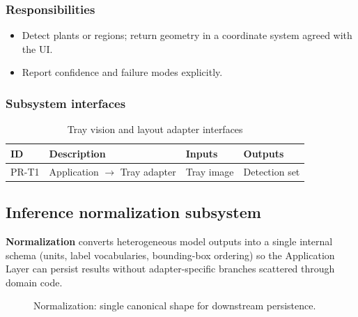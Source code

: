 \subsubsection{Responsibilities}
\begin{itemize}
  \item Detect plants or regions; return geometry in a coordinate system agreed with the UI.
  \item Report confidence and failure modes explicitly.
\end{itemize}

\subsubsection{Subsystem interfaces}
\begin{table}[H]
\centering
\small
\begin{tabular}{|p{0.9cm}|p{3.4cm}|p{3.0cm}|p{3.5cm}|}
\hline
\textbf{ID} & \textbf{Description} & \textbf{Inputs} & \textbf{Outputs} \\
\hline
PR-T1 & Application $\rightarrow$ Tray adapter & Tray image & Detection set \\
\hline
\end{tabular}
\caption{Tray vision and layout adapter interfaces}
\end{table}

\subsection{Inference normalization subsystem}

\textbf{Normalization} converts heterogeneous model outputs into a single internal schema (units, label vocabularies, bounding-box ordering) so the Application Layer can persist results without adapter-specific branches scattered through domain code.

\begin{figure}[H]
\centering
{}
\caption{Normalization: single canonical shape for downstream persistence.}
\label{fig:proc-norm}
\end{figure}

